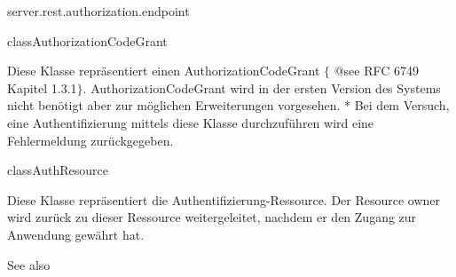 \begin{texdocpackage}{server.rest.authorization.endpoint}
\label{texdoclet:edu.kit.informatik.studyplan.server.rest.authorization.endpoint}

\begin{texdocclass}{class}{AuthorizationCodeGrant}
\label{texdoclet:edu.kit.informatik.studyplan.server.rest.authorization.endpoint.AuthorizationCodeGrant}
\begin{texdocclassintro}
Diese Klasse repräsentiert einen AuthorizationCodeGrant  $\{$ @see RFC 6749 Kapitel 1.3.1$\}$.
 AuthorizationCodeGrant wird in der ersten Version des Systems nicht benötigt aber zur möglichen 
 Erweiterungen vorgesehen.
  * Bei dem Versuch, eine Authentifizierung mittels diese Klasse durchzuführen wird eine Fehlermeldung
 zurückgegeben.\end{texdocclassintro}
\begin{texdocclassconstructors}
\end{texdocclassconstructors}
\begin{texdocclassmethods}
\end{texdocclassmethods}
\end{texdocclass}


\begin{texdocclass}{class}{AuthResource}
\label{texdoclet:edu.kit.informatik.studyplan.server.rest.authorization.endpoint.AuthResource}
\begin{texdocclassintro}
Diese Klasse repräsentiert die Authentifizierung-Ressource.
 Der Resource owner wird zurück zu dieser Ressource weitergeleitet, nachdem er 
 den Zugang zur Anwendung gewährt hat.\end{texdocclassintro}
\begin{texdocclassconstructors}
\end{texdocclassconstructors}
\begin{texdocclassmethods}
\begin{texdocsees}{See also}
\end{texdocsees}


\end{texdocclassmethods}
\end{texdocclass}
\end{texdocpackage}
